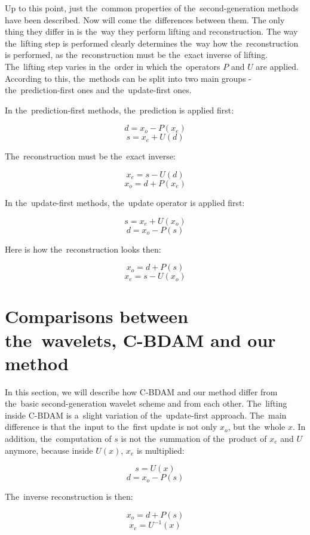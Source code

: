 Up to this point, just the~common properties of the~second-generation methods have been described. Now will come the~differences between them. The only thing they differ in is the~way they perform lifting and reconstruction. The way the~lifting step is performed clearly determines the~way how the~reconstruction is performed, as the~reconstruction must be the~exact inverse of lifting. The~lifting step varies in the~order in which the~operators $P$ and $U$ are applied. According to this, the~methods can be split into two main groups - the~prediction-first ones and the~update-first ones.

In the~prediction-first methods, the~prediction is applied first:

$$d = x_o - P(x_e)$$
$$s = x_e + U(d)$$

The~reconstruction must be the~exact inverse:

$$x_e = s - U(d)$$
$$x_o = d + P(x_e)$$

In the~update-first methods, the~update operator is applied first:

$$s = x_e + U(x_o)$$
$$d = x_o - P(s)$$

Here is how the~reconstruction looks then:

$$x_o = d + P(s)$$
$$x_e = s - U(x_o)$$

\section{Comparisons between the~wavelets, C-BDAM and our method}\label{sec:wavelets_cbdam}
In this section, we will describe how C-BDAM and our method differ from the~basic second-generation wavelet scheme and from each other. The~lifting inside C-BDAM is a~slight variation of the~update-first approach. The~main difference is that the~input to the~first update is not only $x_o$, but the~whole $x$. In addition, the~computation of $s$ is not the~summation of the~product of $x_e$ and $U$ anymore, because inside $U(x)$, $x_e$ is multiplied:

$$s = U(x)$$
$$d = x_o - P(s)$$

The~inverse reconstruction is then:

$$x_o = d + P(s)$$
$$x_e = U^{-1}(x)$$

